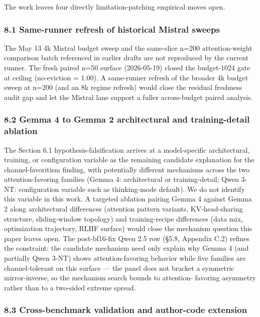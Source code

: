 \documentclass[
]{article}
\begin{document}
The work leaves four directly limitation-patching empirical moves open.

\subsubsection{8.1 Same-runner refresh of historical Mistral
sweeps}\label{81-same-runner-refresh-of-historical-mistral-sweeps}

The May 13 4k Mistral budget sweep and the same-slice n=200
attention-weight comparison batch referenced in earlier drafts are not
reproduced by the current runner. The fresh paired n=50 surface
(2026-05-19) closed the budget-1024 gate at ceiling (no-eviction = 1.00).
A same-runner refresh of the broader 4k budget sweep at n=200 (and an
8k regime refresh) would close the residual freshness audit gap and let
the Mistral lane support a fuller across-budget paired analysis.

\subsubsection{8.2 Gemma 4 to Gemma 2 architectural and training-detail
ablation}\label{82-gemma-4-to-gemma-2-architectural-and-training-detail-ablation}

The Section 6.1 hypothesis-falsification arrives at a model-specific
architectural, training, or configuration variable as the remaining
candidate explanation for the channel-favoritism finding, with
potentially different mechanisms across the two attention-favoring
families (Gemma 4: architectural or training-detail; Qwen 3-NT:
configuration variable such as thinking-mode default). We do not identify this
variable in this work. A targeted ablation pairing Gemma 4 against Gemma
2 along architectural differences (attention pattern variants,
KV-head-sharing structure, sliding-window topology) and training-recipe
differences (data mix, optimization trajectory, RLHF surface) would
close the mechanism question this paper leaves open. The post-bf16-fix
Qwen 2.5 row (§5.8, Appendix C.2) refines the constraint: the
candidate mechanism need only explain why Gemma 4 (and partially Qwen
3-NT) shows attention-favoring behavior while five families are
channel-tolerant on this surface --- the panel does not bracket a
symmetric mirror-inverse, so the mechanism search bounds to attention-
favoring asymmetry rather than to a two-sided extreme spread.

\subsubsection{8.3 Cross-benchmark validation and author-code
extension}\label{83-cross-benchmark-validation-and-author-code-extension}
\end{document}
